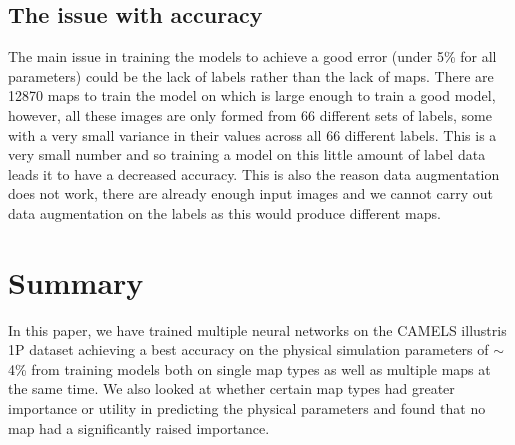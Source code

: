 \documentclass[11pt]{scrartcl}
\begin{document}
\subsection{The issue with accuracy}
\label{Issues}
The main issue in training the models to achieve a good error (under 5\% for all parameters) could be the lack of labels rather than the lack of maps. There are 12870 maps to train the model on which is large enough to train a good model, however, all these images are only formed from 66 different sets of labels, some with a very small variance in their values across all 66 different labels. This is a very small number and so training a model on this little amount of label data leads it to have a decreased accuracy. This is also the reason data augmentation does not work, there are already enough input images and we cannot carry out data augmentation on the labels as this would produce different maps. 

\section{Summary}

In this paper, we have trained multiple neural networks on the CAMELS illustris 1P dataset achieving a best accuracy on the physical simulation parameters of $\sim$ 4\% from training models both on single map types as well as multiple maps at the same time. We also looked at whether certain map types had greater importance or utility in predicting the physical parameters and found that no map had a significantly raised importance. 
\end{document}

